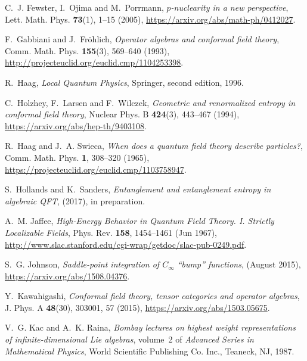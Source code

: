 \documentclass[a4paper,12pt]{article}
\theoremstyle{plain}
\theoremstyle{definition}
\theoremstyle{remark}
\begin{document}
{\begin{thebibliography}{{Haa}96}
C.~J. Fewster, I.~Ojima and M.~Porrmann, \textsl{ {$p$}-nuclearity in a new
  perspective},
\newblock Lett. Math. Phys. \textbf{ 73}(1), 1--15 (2005),
\newblock \url{https://arxiv.org/abs/math-ph/0412027}.

F.~Gabbiani and J.~Fr{\"o}hlich, \textsl{ Operator algebras and conformal field
  theory},
\newblock Comm. Math. Phys. \textbf{ 155}(3), 569--640 (1993),
\newblock \url{http://projecteuclid.org/euclid.cmp/1104253398}.

R.~{Haag},
\newblock \textsl{ Local Quantum Physics},
\newblock Springer, second edition, 1996.

C.~Holzhey, F.~Larsen and F.~Wilczek, \textsl{ Geometric and renormalized
  entropy in conformal field theory},
\newblock Nuclear Phys. B \textbf{ 424}(3), 443--467 (1994),
\newblock \url{https://arxiv.org/abs/hep-th/9403108}.

R.~Haag and J.~A. Swieca, \textsl{ When does a quantum field theory describe
  particles?},
\newblock Comm. Math. Phys. \textbf{ 1}, 308--320 (1965),
\newblock \url{https://projecteuclid.org/euclid.cmp/1103758947}.

S.~Hollands and K.~Sanders, \textsl{ Entanglement and entanglement entropy in
  algebraic QFT},
\newblock (2017),
\newblock in preparation.

A.~M. Jaffee, \textsl{ High-Energy Behavior in Quantum Field Theory. I.
  Strictly Localizable Fields},
\newblock Phys. Rev. \textbf{ 158}, 1454--1461 (Jun 1967),
\newblock \url{http://www.slac.stanford.edu/cgi-wrap/getdoc/slac-pub-0249.pdf}.

S.~G. {Johnson}, \textsl{ {Saddle-point integration of $C_\infty$ ``bump''
  functions}},
\newblock (August 2015),
\newblock \url{https://arxiv.org/abs/1508.04376}.

Y.~Kawahigashi, \textsl{ Conformal field theory, tensor categories and operator
  algebras},
\newblock J. Phys. A \textbf{ 48}(30), 303001, 57 (2015),
\newblock \url{https://arxiv.org/abs/1503.05675}.

V.~G. Kac and A.~K. Raina,
\newblock \textsl{ Bombay lectures on highest weight representations of
  infinite-dimensional {L}ie algebras}, volume~2 of \textsl{ Advanced Series in
  Mathematical Physics},
\newblock World Scientific Publishing Co. Inc., Teaneck, NJ, 1987.


\end{thebibliography}}
\end{document}

